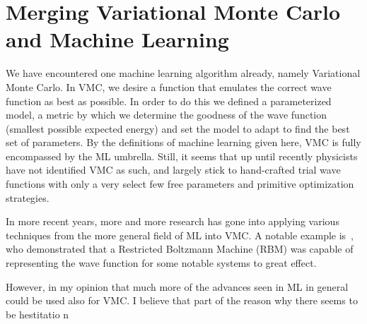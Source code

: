 \documentclass[Thesis.tex]{subfiles}
\begin{document}
\chapter{Merging Variational Monte Carlo and Machine Learning}
\label{chp:mergin-vmc-with-ml}


We have encountered one machine learning algorithm already, namely Variational
Monte Carlo. In VMC, we desire a function that emulates the correct wave
function as best as possible. In order to do this we defined a parameterized
model, a metric by which we determine the goodness of the wave function
(smallest possible expected energy) and set the model to adapt to find the best
set of parameters. By the definitions of machine learning given here, VMC is
fully encompassed by the ML umbrella. Still, it seems that up until recently
physicists have not identified VMC as such, and largely stick to hand-crafted
trial wave functions with only a very select few free parameters and primitive
optimization strategies.

In more recent years, more and more research has gone into applying various
techniques from the more general field of ML into VMC. A notable example
is~\textcite{Carleo602}, who demonstrated that a Restricted Boltzmann Machine
(RBM) was capable of representing the wave function for some notable systems to
great effect.


However, in my opinion that much more of the advances seen in ML in
general could be used also for VMC. I believe that part of the reason why there
seems to be hestitatio n
\end{document}
